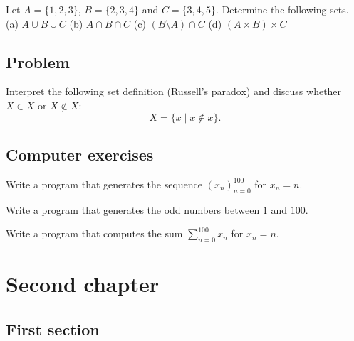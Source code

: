 \documentclass{tstextbook}
\begin{document}
	\begin{exercise}
		Let $A = \{1, 2, 3\}$, $B = \{2, 3, 4\}$ and $C = \{3, 4, 5\}$.
		Determine the following sets. \\
		(a) $A \cup B \cup C$ \quad
		(b) $A \cap B \cap C$ \quad
		(c) $(B \setminus A) \cap C$ \quad
		(d) $(A \times B) \times C$
	\end{exercise}
	
	\section*{Problem}
	
	\begin{problem}
		Interpret the following set definition (Russell's paradox) and discuss
		whether $X \in X$ or $X \notin X$:
		\begin{equation}
			X = \{x \mid x \notin x\}.
		\end{equation}
	\end{problem}
	
	\section*{Computer exercises}
	
	\begin{programming}
		Write a program that generates the sequence $(x_n)_{n=0}^{100}$
		for $x_n = n$.
	\end{programming}
	
	\begin{programming}
		Write a program that generates the odd numbers between $1$ and $100$.
	\end{programming}
	
	\begin{programming}
		Write a program that computes the sum $\sum_{n=0}^{100} x_n$
		for $x_n = n$.
	\end{programming}
	
	\chapter{Second chapter}
	
	\begin{summary}
		\blindtext
	\end{summary}
	
	\section{First section}
	\Blindtext
	
\end{document}
